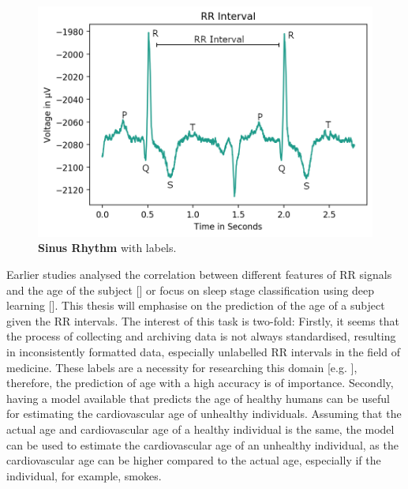 \documentclass[11pt]{scrartcl}
\begin{document}
\begin{figure}[hbt]
	\center
	\includegraphics[width=1.0\textwidth]{img/general/rr-interval.png}
	\caption{\textcolor{viridis5}{\textbf{Sinus Rhythm}} with labels.}
	\label{fig:rr_interval}
\end{figure}

Earlier studies analysed the correlation between different features of RR signals and the age of the subject [\cite{patternshrd}] or focus on sleep stage classification using deep learning [\cite{sleepstageclassification}]. This thesis will emphasise on the prediction of the age of a subject given the RR intervals. The interest of this task is two-fold: Firstly, it seems that the process of collecting and archiving data is not always standardised, resulting in inconsistently formatted data, especially unlabelled RR intervals in the field of medicine. These labels are a necessity for researching this domain [e.g. \cite{10.3389/fphys.2018.00424}], therefore, the prediction of age with a high accuracy is of importance. Secondly, having a model available that predicts the age of healthy humans can be useful for estimating the cardiovascular age of unhealthy individuals. Assuming that the actual age and cardiovascular age of a healthy individual is the same, the model can be used to estimate the cardiovascular age of an unhealthy individual, as the cardiovascular age can be higher compared to the actual age, especially if the individual, for example, smokes.
\end{document}
